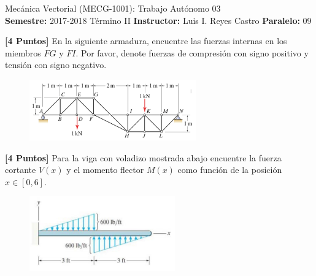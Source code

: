 \documentclass[ a4paper, twoside, 11pt]{article}
\newcommand{\numero}{03}
\begin{document}
\allowdisplaybreaks

\begin{center}
\Large Mec\'anica Vectorial (MECG-1001): Trabajo Aut\'onomo \numero \\[2ex]
\small \textbf{Semestre:} 2017-2018 T\'ermino II \qquad
\textbf{Instructor:} Luis I. Reyes Castro \qquad
\textbf{Paralelo:} 09
\end{center}
\fullskip

\begin{problem}
\textbf{[4 Puntos]} En la siguiente armadura, encuentre las fuerzas internas en los miembros $FG$ y $FI$. Por favor, denote fuerzas de compresi\'on con signo positivo y tensi\'on con signo negativo. 

\begin{figure}[htb]
\centering
\includegraphics[width=0.64\textwidth]{problema-1.jpg}
\end{figure}

\end{problem}
\fullskip
\fullskip

\begin{problem}
\textbf{[4 Puntos]} Para la viga con voladizo mostrada abajo encuentre la fuerza cortante $V(x)$ y el momento flector $M(x)$ como funci\'on de la posici\'on $x \in [0,6]$. 

\begin{figure}[htb]
\centering
\includegraphics[width=0.56\textwidth]{problema-2.jpg}
\end{figure}

\end{problem}
\fullskip
\end{document}
